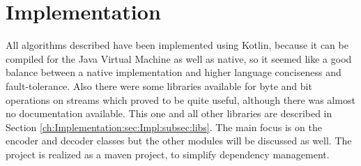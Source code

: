 \chapter{Implementation}
\label{ch:Implementation}
All algorithms described have been implemented using Kotlin, because it can be compiled for the Java Virtual Machine as well as native, so it seemed like a good balance between a native implementation and higher language conciseness and fault-tolerance. Also there were some libraries available for byte and bit operations on streams which proved to be quite useful, although there was almost no documentation available. This one and all other libraries are described in Section \ref{ch:Implementation:sec:Impl:subsec:libs}. The main focus is on the encoder and decoder classes but the other modules will be discussed as well. The project is realized as a maven project, to simplify dependency management. 

